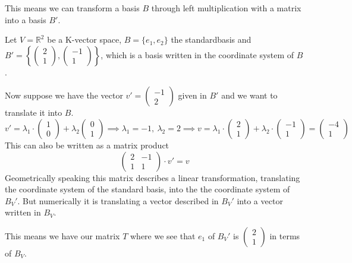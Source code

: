 This means we can transform a basis \(B\) through left multiplication with a matrix into a basis \(B'\).

\begin{example}
   Let \(V = \mathbb{R}^2\) be a K-vector space, \(B = \{e_1, e_2\}\) the standardbasis and \(B' = \left\{\begin{pmatrix}2 \\1\end{pmatrix}, \begin{pmatrix}-1\\1\end{pmatrix}\right\}\), which is a basis written in the coordinate system of \(B\).

   Now suppose we have the vector \(v' = \begin{pmatrix}-1\\2\end{pmatrix}\) given in \(B'\) and we want to translate it into \(B\).
   \[v' = \lambda_1 \cdot \begin{pmatrix}1\\0\end{pmatrix} + \lambda_2 \begin{pmatrix}0\\1\end{pmatrix} \implies \lambda_1 = -1,~\lambda_2 = 2 \implies v = \lambda_1 \cdot \begin{pmatrix}2\\1\end{pmatrix} + \lambda_2 \cdot \begin{pmatrix}-1\\1\end{pmatrix} = \begin{pmatrix}-4\\1\end{pmatrix}\]
   This can also be written as a matrix product
   \[\begin{pmatrix}2 & -1\\1 & 1\end{pmatrix} \cdot v' = v\]
   Geometrically speaking this matrix describes a linear transformation, translating the coordinate system of the standard basis, into the the coordinate system of \(B_V'\).
   But numerically it is translating a vector described in \(B_V'\) into a vector written in \(B_V\).

   This means we have our matrix \(T\) where we see that \(e_1\) of \(B_V'\) is \(\begin{pmatrix}2\\1\end{pmatrix}\) in terms of \(B_V\).
\end{example}

